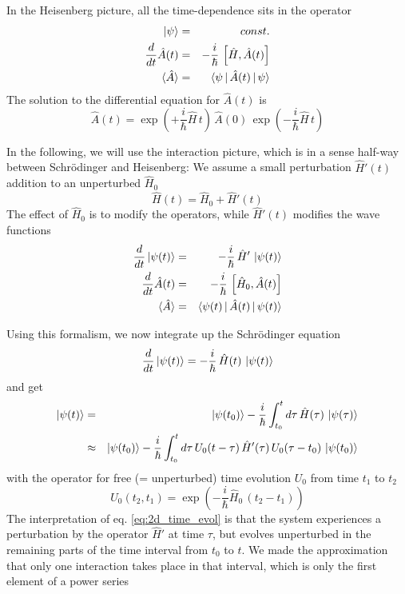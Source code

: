 In the Heisenberg picture, all the time-dependence sits in the operator
\begin{eqnarray}
 \ket{\psi} &=& const. \\
 \frac{d}{dt} \hat{A}(t) &=& - \frac{i}{\hbar} \, \left[ \hat{H} , \hat{A}(t) \right] \\
 \braket{\hat{A}} &=& \braket{\psi \, | \,\hat{A} (t) \, |\, \psi } 
\end{eqnarray}
The solution to the differential equation for  $\hat{A}(t)$ is
\begin{equation}
 \hat{A}(t) = \exp \left(+ \frac{i}{\hbar} \hat{H} \, t \right) \, \hat{A}(0) \, \exp \left(- \frac{i}{\hbar} \hat{H} \, t \right)
\end{equation}


In the following, we will use the interaction picture, which is in a sense half-way between Schrödinger and Heisenberg: We assume a small perturbation $\hat{H}'(t)$ addition to an unperturbed $\hat{H}_0$
\begin{equation}
 \hat{H}(t) = \hat{H}_0 + \hat{H}'(t)
\end{equation}
The effect of  $\hat{H}_0$ is to modify the operators, while $\hat{H}'(t)$ modifies the wave functions
\begin{eqnarray}
  \frac{d}{dt} \ket{\psi(t)} &=& - \frac{i}{\hbar} \, \hat{H}' \, \ket{\psi(t)} \\
 \frac{d}{dt} \hat{A}(t) &=& - \frac{i}{\hbar} \, \left[ \hat{H}_0 , \hat{A}(t) \right] \\
 \braket{\hat{A}} &=& \braket{\psi(t) \, | \,\hat{A} (t) \, |\, \psi(t) } 
\end{eqnarray}

Using this formalism, we now integrate up the Schrödinger equation
\begin{equation}
\frac{d}{dt} \ket{\psi(t)} = - \frac{i}{\hbar} \, \hat{H}(t) \, \ket{\psi(t)} 
\end{equation}
and get
\begin{eqnarray}
\ket{\psi(t)}  & = & \ket{\psi(t_0)} - \frac{i}{\hbar} \int_{t_0}^t d \tau \, \hat{H}(\tau) \, \ket{\psi(\tau)} \\ 
 & \approx & \ket{\psi(t_0)} - \frac{i}{\hbar} \int_{t_0}^t d \tau \,  U_0( t - \tau) \,\hat{H}'(\tau) \,  U_0 (\tau - t_0) \, \ket{\psi(t_0)}  \label{eq:2d_time_evol}
\end{eqnarray}
with the operator for free (= unperturbed) time evolution $U_0$ from time $t_1$ to $t_2$
\begin{equation}
 U_0(t_2, t_1) = \exp \left(- \frac{i}{\hbar} \hat{H}_0 \, ( t_2- t_1) \right)
\end{equation}
The interpretation of eq. \ref{eq:2d_time_evol} is that the system experiences a perturbation by the operator $\hat{H}'$ at time $\tau$, but evolves unperturbed in the remaining parts of the time interval from $t_0$ to $t$. We made the approximation that only one interaction takes place in that interval, which is only the first element of a power series 

